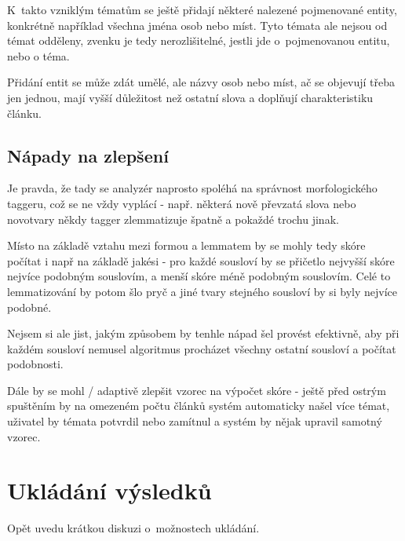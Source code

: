 \documentclass[12pt]{amsart}
\begin{document}
K~takto vzniklým tématům se ještě přidají některé nalezené pojmenované entity, konkrétně například všechna jména osob nebo míst. Tyto témata ale nejsou od  témat odděleny, zvenku je tedy nerozlišitelné, jestli jde o~pojmenovanou entitu, nebo o  téma.

Přidání entit se může zdát umělé, ale názvy osob nebo míst, ač se objevují třeba jen jednou, mají vyšší důležitost než ostatní slova a doplňují charakteristiku  článku.

\subsection{Nápady na zlepšení}
Je pravda, že tady se analyzér naprosto spoléhá na správnost morfologického taggeru, což se ne vždy vyplácí - např. některá nově převzatá slova nebo novotvary někdy tagger zlemmatizuje špatně a pokaždé trochu jinak.

Místo na základě vztahu mezi formou a lemmatem by se mohly tedy skóre počítat i např na základě jakési  - pro každé sousloví by se přičetlo nejvyšší skóre nejvíce podobným souslovím, a menší skóre méně podobným souslovím. Celé to lemmatizování by potom šlo pryč a jiné tvary stejného sousloví by si byly nejvíce podobné.

Nejsem si ale jist, jakým způsobem by tenhle nápad šel provést efektivně, aby při každém sousloví nemusel algoritmus procházet všechny ostatní sousloví a počítat podobnosti.

Dále by se mohl  / adaptivě zlepšit vzorec na výpočet skóre - ještě před ostrým spuštěním by na omezeném počtu článků systém automaticky našel více témat, uživatel by témata potvrdil nebo zamítnul a systém by nějak upravil samotný vzorec.

\section{Ukládání výsledků}
Opět uvedu krátkou diskuzi o~možnostech ukládání.
\end{document}
